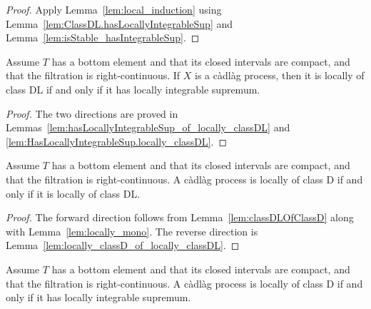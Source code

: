 \begin{proof}
  \leanok
Apply Lemma~\ref{lem:local_induction} using Lemma~\ref{lem:ClassDL.hasLocallyIntegrableSup} and Lemma~\ref{lem:isStable_hasIntegrableSup}.
\end{proof}


\begin{lemma}\label{lem:locally_classDL_iff_locallyIntegrableSup}
  \leanok
Assume $T$ has a bottom element and that its closed intervals are compact, and that the filtration is right-continuous.
If $X$ is a càdlàg process, then it is locally of class DL if and only if it has locally integrable supremum.
\end{lemma}

\begin{proof}
  \leanok
The two directions are proved in Lemmas~\ref{lem:hasLocallyIntegrableSup_of_locally_classDL} and \ref{lem:HasLocallyIntegrableSup.locally_classDL}.
\end{proof}


\begin{lemma}\label{lem:locally_classD_iff_locally_classDL}
  \leanok
Assume $T$ has a bottom element and that its closed intervals are compact, and that the filtration is right-continuous.
A càdlàg process is locally of class D if and only if it is locally of class DL.
\end{lemma}

\begin{proof}
  \leanok
The forward direction follows from Lemma~\ref{lem:classDLOfClassD} along with Lemma~\ref{lem:locally_mono}.
The reverse direction is Lemma~\ref{lem:locally_classD_of_locally_classDL}.
\end{proof}


\begin{lemma}\label{lem:locally_classD_iff_locallyIntegrableSup}
  \leanok
Assume $T$ has a bottom element and that its closed intervals are compact, and that the filtration is right-continuous.
A càdlàg process is locally of class D if and only if it has locally integrable supremum.
\end{lemma}

